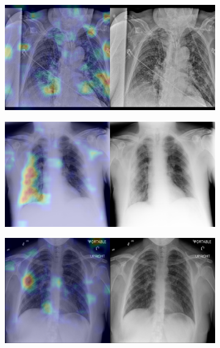 \begin{figure}[b]
\begin{subfigure}{0.4\textwidth}
    \end{subfigure}
    \begin{subfigure}{0.4\textwidth}
        \centering
        \includegraphics[width=1.0\textwidth]{Chapters/5. Conclusiones/img/COVID-19/1_1_1b5ca94ac38b_0919a3b8af01.png}
    \end{subfigure}
    \begin{subfigure}{0.4\textwidth}
        \centering
        \includegraphics[width=1.0\textwidth]{Chapters/5. Conclusiones/img/COVID-19/1_1_1e3f6f8e494c_efe83e860c17.png}
    \end{subfigure}
    \begin{subfigure}{0.4\textwidth}
        \centering
        \includegraphics[width=1.0\textwidth]{Chapters/5. Conclusiones/img/COVID-19/1_1_4bb14a344446_0d3910133fbe.png}

\end{subfigure}
\end{figure}
